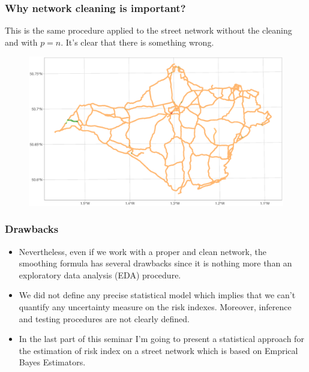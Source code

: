 \documentclass[c,10pt,pdftex]{beamer}
\begin{document}
\begin{frame}
\frametitle{Why network cleaning is important?}
\vspace{-0.25cm}
This is the same procedure applied to the street network without the cleaning and with $p = n$. It's clear that there is something wrong.
\begin{figure}
	\centering
	\includegraphics[width=\linewidth]{images/importance_of_network_cleaning}
\end{figure}
\end{frame}

\begin{frame}
\frametitle{Drawbacks}
\vspace{-0.75cm}
\begin{itemize}
	\setlength\itemsep{1em}
	\item Nevertheless, even if we work with a proper and clean network, the smoothing formula has several drawbacks since it is nothing more than an exploratory data analysis (EDA) procedure. 
	
	\item We did not define any precise statistical model which implies that we can't quantify any uncertainty measure on the risk indexes. Moreover, inference and testing procedures are not clearly defined. 
	
	\item In the last part of this seminar I'm going to present a statistical approach for the estimation of risk index on a street network which is based on \alert{Emprical Bayes Estimators}. 	
\end{itemize}
\end{frame}
\end{document}
